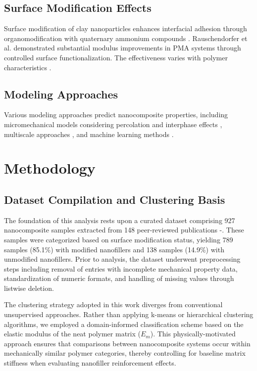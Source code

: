\documentclass[conference]{IEEEtran}
\begin{document}
\subsection{Surface Modification Effects}

Surface modification of clay nanoparticles enhances interfacial adhesion through organomodification with quaternary ammonium compounds \cite{138, 134}. Rauschendorfer et al. \cite{1} demonstrated substantial modulus improvements in PMA systems through controlled surface functionalization. The effectiveness varies with polymer characteristics \cite{69, 90, 107}.

\subsection{Modeling Approaches}

Various modeling approaches predict nanocomposite properties, including micromechanical models considering percolation and interphase effects \cite{8, 9, 12, 13, 11, 17}, multiscale approaches \cite{22}, and machine learning methods \cite{79, 116}.

\section{Methodology}

\subsection{Dataset Compilation and Clustering Basis}

The foundation of this analysis rests upon a curated dataset comprising 927 nanocomposite samples extracted from 148 peer-reviewed publications \cite{1}-\cite{148}. These samples were categorized based on surface modification status, yielding 789 samples (85.1\%) with modified nanofillers and 138 samples (14.9\%) with unmodified nanofillers. Prior to analysis, the dataset underwent preprocessing steps including removal of entries with incomplete mechanical property data, standardization of numeric formats, and handling of missing values through listwise deletion.

The clustering strategy adopted in this work diverges from conventional unsupervised approaches. Rather than applying k-means or hierarchical clustering algorithms, we employed a domain-informed classification scheme based on the elastic modulus of the neat polymer matrix ($E_m$). This physically-motivated approach ensures that comparisons between nanocomposite systems occur within mechanically similar polymer categories, thereby controlling for baseline matrix stiffness when evaluating nanofiller reinforcement effects.
\end{document}
